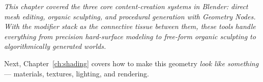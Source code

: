 \vspace{2em}

\begin{quotebox}
\itshape This chapter covered the three core content-creation systems in Blender: direct mesh editing, organic sculpting, and procedural generation with Geometry Nodes. With the modifier stack as the connective tissue between them, these tools handle everything from precision hard-surface modeling to free-form organic sculpting to algorithmically generated worlds.

\upshape Next, Chapter~\ref{ch:shading} covers how to make this geometry \textit{look like something} --- materials, textures, lighting, and rendering.
\end{quotebox}
